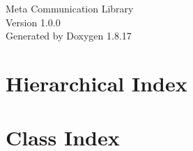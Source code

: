 \let\mypdfximage\pdfximage\def\pdfximage{\immediate\mypdfximage}\documentclass[twoside]{book}
\newcommand{\+}{\discretionary{\mbox{\scriptsize$\hookleftarrow$}}{}{}}
\newcommand{\clearemptydoublepage}{%
  \newpage{\pagestyle{empty}\cleardoublepage}%
}
\begin{document}
\hypersetup{pageanchor=false,
             bookmarksnumbered=true,
             pdfencoding=unicode
            }
\begin{titlepage}
\vspace*{7cm}
\begin{center}%
{\Large Meta Communication Library \\[1ex]\large Version 1.\+0.\+0 }\\
\vspace*{1cm}
{\large Generated by Doxygen 1.8.17}\\
\end{center}
\end{titlepage}
\clearemptydoublepage
{}
\tableofcontents
\clearemptydoublepage
{}
\hypersetup{pageanchor=true}

\chapter{Hierarchical Index}

\chapter{Class Index}

\end{document}
